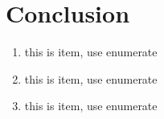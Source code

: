 


%
%


\section{Conclusion}


\begin{enumerate}
\item this is item, use enumerate
\item this is item, use enumerate
\item this is item, use enumerate
\end{enumerate}

